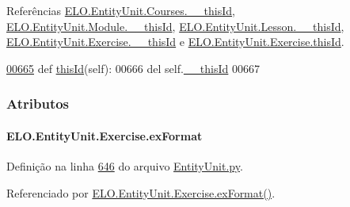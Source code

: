 Referências \hyperlink{EntityUnit_8py_source_l00457}{E\+L\+O.\+Entity\+Unit.\+Courses.\+\_\+\+\_\+this\+Id}, \hyperlink{EntityUnit_8py_source_l00536}{E\+L\+O.\+Entity\+Unit.\+Module.\+\_\+\+\_\+this\+Id}, \hyperlink{EntityUnit_8py_source_l00598}{E\+L\+O.\+Entity\+Unit.\+Lesson.\+\_\+\+\_\+this\+Id}, \hyperlink{EntityUnit_8py_source_l00660}{E\+L\+O.\+Entity\+Unit.\+Exercise.\+\_\+\+\_\+this\+Id} e \hyperlink{classELO_1_1EntityUnit_1_1Exercise_a6277daccaa7fe96d8f0a287002cea07a}{E\+L\+O.\+Entity\+Unit.\+Exercise.\+this\+Id}.


\begin{DoxyCode}
\hypertarget{classELO_1_1EntityUnit_1_1Exercise_l00665}{}\hyperlink{classELO_1_1EntityUnit_1_1Exercise_a08d2177411dd803182cc9b22fb8951d3}{00665}     \textcolor{keyword}{def }\hyperlink{classELO_1_1EntityUnit_1_1Exercise_a6277daccaa7fe96d8f0a287002cea07a}{thisId}(self):
00666         del self.\hyperlink{classELO_1_1EntityUnit_1_1Exercise_a2a42ad5ac0aa08817f42b93df586db65}{\_\_thisId}
00667 
\end{DoxyCode}


\subsubsection{Atributos}
\hypertarget{classELO_1_1EntityUnit_1_1Exercise_a0d17db96aa0caa63df47795c50818e9f}{}
\paragraph[{ex\+Format}]{\setlength{\rightskip}{0pt plus 5cm}E\+L\+O.\+Entity\+Unit.\+Exercise.\+ex\+Format}\label{classELO_1_1EntityUnit_1_1Exercise_a0d17db96aa0caa63df47795c50818e9f}


Definição na linha \hyperlink{EntityUnit_8py_source_l00646}{646} do arquivo \hyperlink{EntityUnit_8py_source}{Entity\+Unit.\+py}.



Referenciado por \hyperlink{classELO_1_1EntityUnit_1_1Exercise_aec6bfb3b8ce079fc8495493d0b851c1c}{E\+L\+O.\+Entity\+Unit.\+Exercise.\+ex\+Format()}.

\hypertarget{classELO_1_1EntityUnit_1_1Exercise_af982926b59b32980803f93f40b383d77}{}
